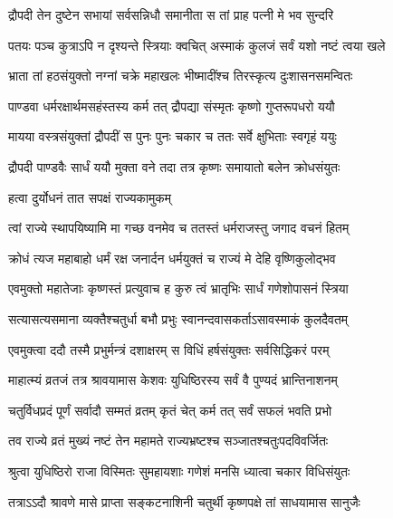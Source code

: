 \twolineshloka
{द्रौपदी तेन दुष्टेन सभायां सर्वसन्निधौ}
{समानीता स तां प्राह पत्नी मे भव सुन्दरि} %

\twolineshloka
{पतयः पञ्च कुत्राऽपि न दृश्यन्ते स्त्रियाः क्वचित्}
{अस्माकं कुलजं सर्वं यशो नष्टं त्वया खले} %

\twolineshloka
{भ्राता तां हठसंयुक्तो नग्नां चक्रे महाखलः}
{भीष्मादींश्च तिरस्कृत्य दुःशासनसमन्वितः} %

\twolineshloka
{पाण्डवा धर्मरक्षार्थमसहंस्तस्य कर्म तत्}
{द्रौपद्या संस्मृतः कृष्णो गुप्तरूपधरो ययौ} %

\twolineshloka
{मायया वस्त्रसंयुक्तां द्रौपदीं स पुनः पुनः}
{चकार च ततः सर्वे क्षुभिताः स्वगृहं ययुः} %

\twolineshloka
{द्रौपदी पाण्डवैः सार्धं ययौ मुक्ता वने तदा}
{तत्र कृष्णः समायातो बलेन क्रोधसंयुतः} %



\onelineshloka
{हत्वा दुर्योधनं तात सपक्षं राज्यकामुकम्} %

\twolineshloka
{त्वां राज्ये स्थापयिष्यामि मा गच्छ वनमेव च}
{ततस्तं धर्मराजस्तु जगाद वचनं हितम्} %

\twolineshloka
{क्रोधं त्यज महाबाहो धर्मं रक्ष जनार्दन}
{धर्मयुक्तं च राज्यं मे देहि वृष्णिकुलोद्भव} %

\twolineshloka
{एवमुक्तो महातेजाः कृष्णस्तं प्रत्युवाच ह}
{कुरु त्वं भ्रातृभिः सार्धं गणेशोपासनं स्त्रिया} %

\twolineshloka
{सत्यासत्यसमाना व्यक्तैश्चतुर्धा बभौ प्रभुः}
{स्वानन्दवासकर्ताऽसावस्माकं कुलदैवतम्} %

\twolineshloka
{एवमुक्त्वा ददौ तस्मै प्रभुर्मन्त्रं दशाक्षरम्}
{स विधिं हर्षसंयुक्तः सर्वसिद्धिकरं परम्} %

\twolineshloka
{माहात्म्यं व्रतजं तत्र श्रावयामास केशवः}
{युधिष्ठिरस्य सर्वं वै पुण्यदं भ्रान्तिनाशनम्} %

\twolineshloka
{चतुर्विधप्रदं पूर्णं सर्वादौ सम्मतं व्रतम्}
{कृतं चेत् कर्म तत् सर्वं सफलं भवति प्रभो} %

\twolineshloka
{तव राज्ये व्रतं मुख्यं नष्टं तेन महामते}
{राज्यभ्रष्टश्च सञ्जातश्चतुःपदविवर्जितः} %

\twolineshloka
{श्रुत्वा युधिष्ठिरो राजा विस्मितः सुमहायशाः}
{गणेशं मनसि ध्यात्वा चकार विधिसंयुतः} %

\twolineshloka
{तत्राऽऽदौ श्रावणे मासे प्राप्ता सङ्कटनाशिनी}
{चतुर्थी कृष्णपक्षे तां साधयामास सानुजैः} %

